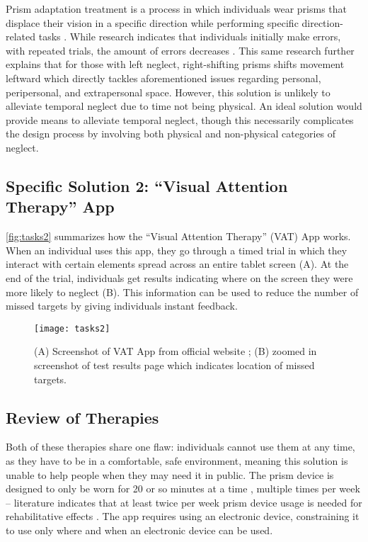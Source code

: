 Prism adaptation treatment is a process in which individuals wear prisms that
displace their vision in a specific direction while performing specific
direction-related tasks \cite{goedert_prism_2015}. While research indicates
that individuals initially make errors, with repeated trials, the amount of
errors decreases \cite{goedert_prism_2015}. This same research further explains
that for those with left neglect, right-shifting prisms shifts movement
leftward \cite{goedert_prism_2015} which directly tackles aforementioned issues
regarding personal, peripersonal, and extrapersonal space. However, this
solution is unlikely to alleviate temporal neglect due to time not being
physical. An ideal solution would provide means to alleviate temporal neglect,
though this necessarily complicates the design process by involving both
physical and non-physical categories of neglect. 

\subsection{Specific Solution 2: “Visual Attention Therapy” App}

\autoref{fig:tasks2} summarizes how the “Visual Attention Therapy” (VAT) App
works. When an individual uses this app, they go through a timed trial in which
they interact with certain elements spread across an entire tablet screen
(A). At the end of the trial, individuals get results indicating where on the
screen they were more likely to neglect (B). This information can be used to
reduce the number of missed targets by giving individuals instant feedback.

\begin{figure}[h]
  \centering
  \texttt{[image: tasks2]}
  \caption[Visual Attention Therapy App]{(A) Screenshot of VAT App from
    official website \cite{tactustherapy_visual_nodate}; (B) zoomed in
    screenshot of test results page which indicates location of missed
    targets.} 
  \label{fig:tasks2}
\end{figure}

\subsection{Review of Therapies}

Both of these therapies share one flaw: individuals cannot use them at any
time, as they have to be in a comfortable, safe environment, meaning this
solution is unable to help people when they may need it in public. The prism
device is designed to only be worn for 20 or so minutes at a time
\cite{goedert_prism_2015}, multiple times per week – literature indicates that
at least twice per week prism device usage is needed for rehabilitative effects
\cite{goedert_prism_2015}. The app requires using an electronic device,
constraining it to use only where and when an electronic device can be used.

